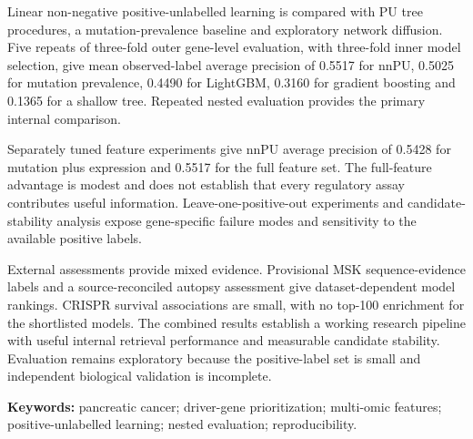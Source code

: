 \documentclass[12pt,a4paper,oneside]{report}
\begin{document}
Linear non-negative positive-unlabelled learning is compared with PU tree procedures, a mutation-prevalence baseline and exploratory network diffusion. Five repeats of three-fold outer gene-level evaluation, with three-fold inner model selection, give mean observed-label average precision of 0.5517 for nnPU, 0.5025 for mutation prevalence, 0.4490 for LightGBM, 0.3160 for gradient boosting and 0.1365 for a shallow tree. Repeated nested evaluation provides the primary internal comparison.

Separately tuned feature experiments give nnPU average precision of 0.5428 for mutation plus expression and 0.5517 for the full feature set. The full-feature advantage is modest and does not establish that every regulatory assay contributes useful information. Leave-one-positive-out experiments and candidate-stability analysis expose gene-specific failure modes and sensitivity to the available positive labels.

External assessments provide mixed evidence. Provisional MSK sequence-evidence labels and a source-reconciled autopsy assessment give dataset-dependent model rankings. CRISPR survival associations are small, with no top-100 enrichment for the shortlisted models. The combined results establish a working research pipeline with useful internal retrieval performance and measurable candidate stability. Evaluation remains exploratory because the positive-label set is small and independent biological validation is incomplete.

\vspace{3mm}\noindent\textbf{Keywords:} pancreatic cancer; driver-gene prioritization; multi-omic features; positive-unlabelled learning; nested evaluation; reproducibility.

\tableofcontents
\clearpage
\listoffigures
{}
\clearpage
\listoftables
{}
\clearpage
\end{document}
